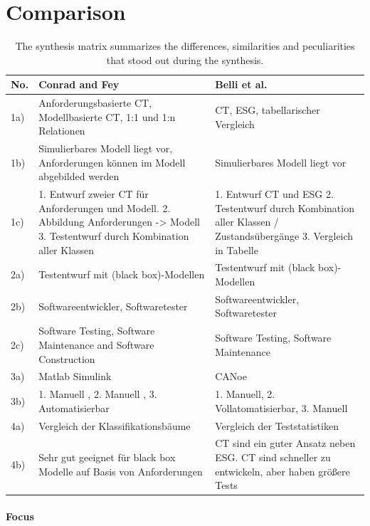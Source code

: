 \section{Comparison}
\label{Kap:Comparison}

\begin{small} 		
	\begin{longtable}[h]{p{0.45cm}|p{}|p{}}
	\caption{The synthesis matrix summarizes the differences, similarities and peculiarities that stood out during the synthesis.}
	\label{tab:synthesematrix_julian}
	\\    %
	\hline
	\textbf{No.} & \textbf{Conrad and Fey} & \textbf{Belli et al.} \\
	\hline
	1a) & Anforderungsbasierte CT, Modellbasierte CT,  1:1 und 1:n Relationen & CT, ESG, tabellarischer Vergleich \\
	\hline	
	1b) & Simulierbares Modell liegt vor, Anforderungen können im Modell abgebilded werden & Simulierbares Modell liegt vor \\
	\hline	
	1c) & 1. Entwurf zweier CT für Anforderungen und Modell. 2. Abbildung Anforderungen -> Modell 3. Testentwurf durch Kombination aller Klassen & 1. Entwurf CT und ESG 2. Testentwurf durch Kombination aller Klassen / Zustandsübergänge 3. Vergleich in Tabelle \\
	\hline	
	2a) & Testentwurf mit (black box)-Modellen & Testentwurf mit (black box)-Modellen \\
	\hline	
	2b) & Softwareentwickler, Softwaretester & Softwareentwickler,  Softwaretester  \\
	\hline	
	2c) & Software Testing, Software Maintenance and Software Construction & Software Testing, Software Maintenance \\
	\hline
	3a) & Matlab Simulink & CANoe \\
	\hline
	3b) & 1. Manuell , 2. Manuell , 3. Automatisierbar & 1. Manuell, 2. Vollatomatisierbar, 3. Manuell \\
	\hline	
	4a) & Vergleich der Klassifikationsbäume & 
	Vergleich der Teststatistiken  \\
	\hline	
	4b) & Sehr gut geeignet für black box Modelle auf Basis von Anforderungen & CT sind ein guter Ansatz neben ESG. CT sind schneller zu entwickeln, aber haben größere Tests \\
	\hline	
	\end{longtable}
\end{small}

\newpage
\paragraph{Focus}

